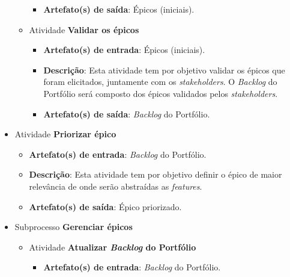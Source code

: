 \begin{itemize}
\begin{itemize}
\begin{itemize}
		\item \textbf{Artefato(s) de saída}: Épicos (iniciais).
		      
	      \end{itemize}
	      
	  \item Atividade \textbf{Validar os épicos}
	  
	      \begin{itemize}
		\item \textbf{Artefato(s) de entrada}: Épicos (iniciais).
		
		\item \textbf{Descrição}: Esta atividade tem por objetivo validar os épicos que foram elicitados, juntamente
		com os \textit{stakeholders}. O \textit{Backlog} do Portfólio será composto dos épicos validados pelos
		\textit{stakeholders}.
		
		\item \textbf{Artefato(s) de saída}: \textit{Backlog} do Portfólio.
		      
	      \end{itemize}
	\end{itemize} %
	      
      \item Atividade \textbf{Priorizar épico}
      
	  \begin{itemize}
	    \item \textbf{Artefato(s) de entrada}: \textit{Backlog}  do Portfólio.
	    
	    \item \textbf{Descrição}: Esta atividade tem por objetivo definir o épico de maior relevância de onde serão
	      abstraídas as \textit{features}.
	    
	    \item \textbf{Artefato(s) de saída}: Épico priorizado.
		  
	  \end{itemize}
	   
	
     \item Subprocesso \textbf{Gerenciar épicos}
     
	\begin{itemize}
	 
	 \item Atividade \textbf{Atualizar \textit{Backlog} do Portfólio}
	    
	    \begin{itemize}
	      \item \textbf{Artefato(s) de entrada}: \textit{Backlog} do Portfólio.


\end{itemize}
\end{itemize}
\end{itemize}
